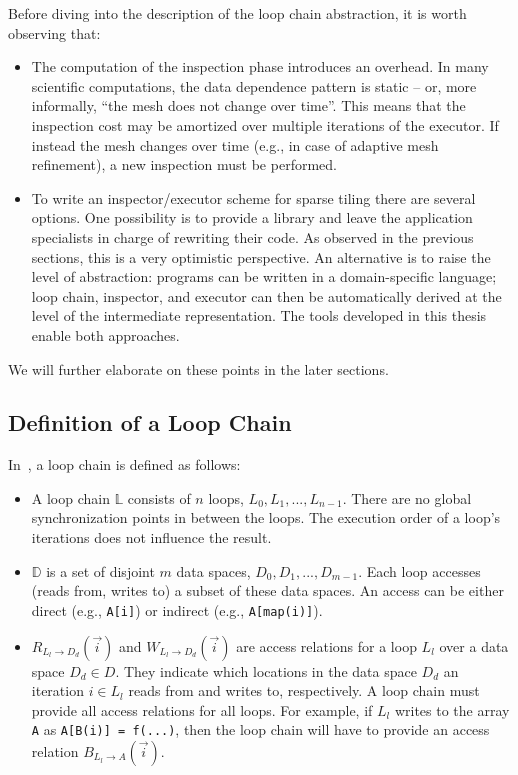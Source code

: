 Before diving into the description of the loop chain abstraction, it is worth observing that:
\begin{itemize}
\item The computation of the inspection phase introduces an overhead. In many scientific computations, the data dependence pattern is static -- or, more informally, ``the mesh does not change over time''. This means that the inspection cost may be amortized over multiple iterations of the executor. If instead the mesh changes over time (e.g., in case of adaptive mesh refinement), a new inspection must be performed. 
\item To write an inspector/executor scheme for sparse tiling there are several options. One possibility is to provide a library and leave the application specialists in charge of rewriting their code. As observed in the previous sections, this is a very optimistic perspective. An alternative is to raise the level of abstraction: programs can be written in a domain-specific language; loop chain, inspector, and executor can then be automatically derived at the level of the intermediate representation. The tools developed in this thesis enable both approaches.
\end{itemize}
We will further elaborate on these points in the later sections. 

\subsection{Definition of a Loop Chain}
In~\cite{ST-KriegerHIPS2013}, a loop chain is defined as follows:
\begin{itemize}
\item A loop chain $\mathbb{L}$ consists of $n$ loops, $L_0, L_1, ..., L_{n-1}$. There are no global synchronization points in between the loops. The execution order of a loop's iterations does not influence the result.
\item $\mathbb{D}$ is a set of disjoint $m$ data spaces, $D_0, D_1, ..., D_{m-1}$. Each loop accesses (reads from, writes to) a subset of these data spaces. An access can be either direct (e.g., \texttt{A[i]}) or indirect (e.g., \texttt{A[map(i)]}).
\item $R_{L_l\rightarrow D_d}(\vec{i})$ and $W_{L_l\rightarrow D_d}(\vec{i})$ are access relations for a loop $L_l$ over a data space $D_d \in D$. They indicate which locations in the data space $D_d$ an iteration $i \in L_l$ reads from and writes to, respectively. A loop chain must provide all access relations for all loops. For example, if $L_l$ writes to the array {\tt A} as {\tt A[B(i)] = f(...)}, then the loop chain will have to provide an access relation $B_{L_l\rightarrow A}(\vec{i})$. 
\end{itemize}

